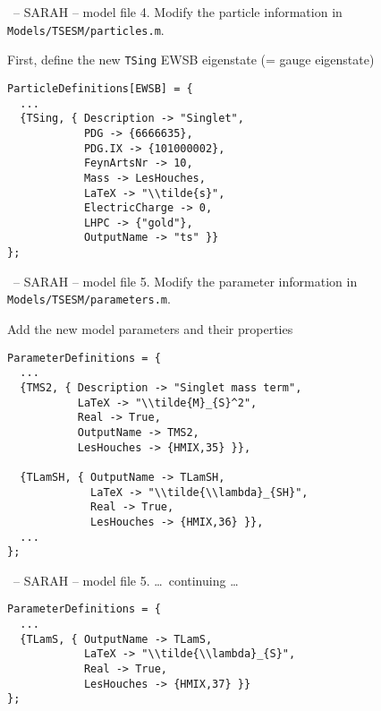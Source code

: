 \documentclass[11pt]{beamer}
\begin{document}
\begin{frame}[fragile]{\insertsection\ -- SARAH -- model file}
  4. Modify the particle information in
  \texttt{Models/TSESM/particles.m}.

  \bigskip

  First, define the new \texttt{TSing} EWSB eigenstate (= gauge eigenstate)
  \begin{lstlisting}
ParticleDefinitions[EWSB] = {
  ...
  {TSing, { Description -> "Singlet",
            PDG -> {6666635},
            PDG.IX -> {101000002},
            FeynArtsNr -> 10,
            Mass -> LesHouches,
            LaTeX -> "\\tilde{s}",
            ElectricCharge -> 0,
            LHPC -> {"gold"},
            OutputName -> "ts" }}
};\end{lstlisting}
\end{frame}


\begin{frame}[fragile]{\insertsection\ -- SARAH -- model file}
  5. Modify the parameter information in
  \texttt{Models/TSESM/parameters.m}.

  \bigskip

  Add the new model parameters and their properties
  \begin{lstlisting}
ParameterDefinitions = {
  ...
  {TMS2, { Description -> "Singlet mass term",
           LaTeX -> "\\tilde{M}_{S}^2",
           Real -> True, 
           OutputName -> TMS2,
           LesHouches -> {HMIX,35} }}, 

  {TLamSH, { OutputName -> TLamSH,
             LaTeX -> "\\tilde{\\lambda}_{SH}",
             Real -> True, 
             LesHouches -> {HMIX,36} }},
  ...
};\end{lstlisting}
\end{frame}


\begin{frame}[fragile]{\insertsection\ -- SARAH -- model file}
  5. \ldots\ continuing \ldots
  \begin{lstlisting}
ParameterDefinitions = {
  ...
  {TLamS, { OutputName -> TLamS,
            LaTeX -> "\\tilde{\\lambda}_{S}",
            Real -> True, 
            LesHouches -> {HMIX,37} }}
};\end{lstlisting}
\end{frame}
\end{document}
